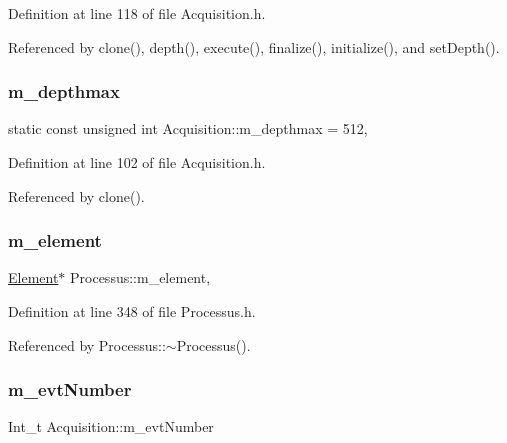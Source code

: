 Definition at line 118 of file Acquisition.\+h.



Referenced by clone(), depth(), execute(), finalize(), initialize(), and set\+Depth().

\mbox{\label{classAcquisition_a82cdfc89b37f20530bf112e13a5c5e5c}} 
\subsubsection{\texorpdfstring{m\+\_\+depthmax}{m\_depthmax}}
{\footnotesize\ttfamily static const unsigned int Acquisition\+::m\+\_\+depthmax = 512\hspace{0.3cm}{\ttfamily [static]}, {\ttfamily [private]}}



Definition at line 102 of file Acquisition.\+h.



Referenced by clone().

\mbox{\label{classProcessus_aa9d24d53c3e52f36786cabb5d8e296e7}} 
\subsubsection{\texorpdfstring{m\+\_\+element}{m\_element}}
{\footnotesize\ttfamily \hyperlink{classElement}{Element}$\ast$ Processus\+::m\+\_\+element\hspace{0.3cm}{\ttfamily [protected]}, {\ttfamily [inherited]}}



Definition at line 348 of file Processus.\+h.



Referenced by Processus\+::$\sim$\+Processus().

\mbox{\label{classAcquisition_a32a70daa3f653eae5eafc46dbd0e11a6}} 
\subsubsection{\texorpdfstring{m\+\_\+evt\+Number}{m\_evtNumber}}
{\footnotesize\ttfamily Int\+\_\+t Acquisition\+::m\+\_\+evt\+Number\hspace{0.3cm}{\ttfamily [private]}}



